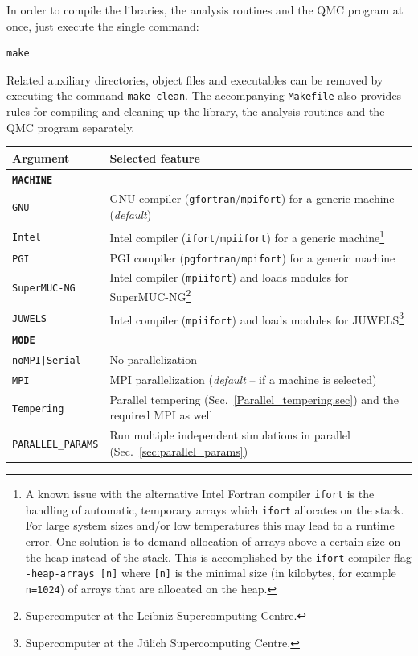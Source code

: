 In order to compile the libraries, the analysis routines and the QMC program at once, just execute the single command:%
\begin{lstlisting}[style=bash,morekeywords={make}]
make
\end{lstlisting}
Related auxiliary directories, object files and executables can be removed by executing the command \lstinline[style=bash,morekeywords={make}]{make clean}. The accompanying \texttt{Makefile} also provides rules for compiling and cleaning up the library, the analysis routines and the QMC program separately.  

\begin{table}[!ht]
	\begin{center}
		\begin{tabular}{@{} p{} p{} @{}}\toprule %
			Argument & Selected feature \\\midrule
			\textbf{\texttt{MACHINE}} &  \\\midrule
			\texttt{GNU}  &   GNU compiler (\texttt{gfortran}/\texttt{mpifort}) for a generic machine (\emph{default}) \\
			\texttt{Intel}  &   Intel compiler (\texttt{ifort}/\texttt{mpiifort}) for a generic machine\footnote{A known issue with the alternative Intel Fortran compiler \texttt{ifort} is the handling of automatic, temporary arrays 
				which \texttt{ifort} allocates on the stack. For large system sizes and/or low temperatures this may lead to a runtime error. One solution is to demand allocation of arrays above a certain size on the heap instead of the stack. This is accomplished by the \texttt{ifort} compiler flag \texttt{-heap-arrays [n]} where \texttt{[n]} is the minimal size (in kilobytes, for example \texttt{n=1024}) of arrays that are allocated on the heap.} \\
			\texttt{PGI}  &   PGI compiler (\texttt{pgfortran}/\texttt{mpifort}) for a generic machine \\
			\texttt{SuperMUC-NG}  &  Intel compiler (\texttt{mpiifort}) and loads modules for SuperMUC-NG\footnote{Supercomputer at the Leibniz Supercomputing Centre.} \\
			\texttt{JUWELS}  &  Intel compiler (\texttt{mpiifort}) and loads modules for JUWELS\footnote{Supercomputer at the J\"ulich Supercomputing Centre.}
			\vspace{7pt}\\
			
			\textbf{\texttt{MODE}} &  \\\midrule
			\texttt{noMPI|Serial}  &  No parallelization \\
			\texttt{MPI}  &  MPI parallelization (\emph{default} -- if a machine is selected) \\
			\texttt{Tempering}  &  Parallel tempering (Sec.~\ref{Parallel_tempering.sec}) and the required MPI as well \\
			\texttt{PARALLEL\_PARAMS}  & Run multiple independent simulations in parallel (Sec.~\ref{sec:parallel_params})
			\vspace{7pt}\\ 
			

\end{tabular}
\end{center}
\end{table}

